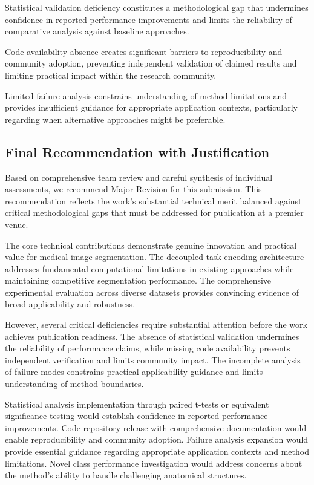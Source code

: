 Statistical validation deficiency constitutes a methodological gap that undermines confidence in reported performance improvements and limits the reliability of comparative analysis against baseline approaches.

Code availability absence creates significant barriers to reproducibility and community adoption, preventing independent validation of claimed results and limiting practical impact within the research community.

Limited failure analysis constrains understanding of method limitations and provides insufficient guidance for appropriate application contexts, particularly regarding when alternative approaches might be preferable.

\subsection*{Final Recommendation with Justification}
Based on comprehensive team review and careful synthesis of individual assessments, we recommend Major Revision for this submission. This recommendation reflects the work's substantial technical merit balanced against critical methodological gaps that must be addressed for publication at a premier venue.

The core technical contributions demonstrate genuine innovation and practical value for medical image segmentation. The decoupled task encoding architecture addresses fundamental computational limitations in existing approaches while maintaining competitive segmentation performance. The comprehensive experimental evaluation across diverse datasets provides convincing evidence of broad applicability and robustness.

However, several critical deficiencies require substantial attention before the work achieves publication readiness. The absence of statistical validation undermines the reliability of performance claims, while missing code availability prevents independent verification and limits community impact. The incomplete analysis of failure modes constrains practical applicability guidance and limits understanding of method boundaries.

Statistical analysis implementation through paired t-tests or equivalent significance testing would establish confidence in reported performance improvements. Code repository release with comprehensive documentation would enable reproducibility and community adoption. Failure analysis expansion would provide essential guidance regarding appropriate application contexts and method limitations. Novel class performance investigation would address concerns about the method's ability to handle challenging anatomical structures.

